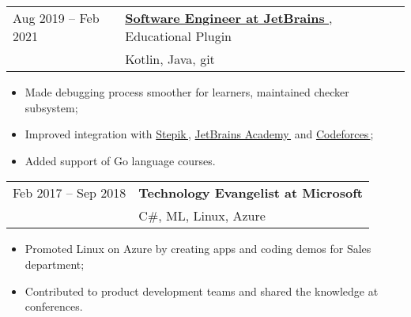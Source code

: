 \documentclass[11pt]{res} %
\let\orighref\href
\renewcommand{\href}[2]{\orighref{#1}{#2\,\faExternalLink}}
\begin{document}
\begin{resume}
        \begin{tabular}{ll}
            Aug 2019 -- Feb 2021 \quad & \textbf{\href{https://github.com/JetBrains/educational-plugin}{Software Engineer at JetBrains}}, Educational Plugin \\
            & Kotlin, Java, git \\
        \end{tabular}

        \begin{itemize} \itemsep -2pt
            \item Made debugging process smoother for learners, maintained checker subsystem;
            \item Improved integration with \href{https://stepik.org/}{Stepik}, \href{https://hyperskill.org}{JetBrains Academy} and \href{http://codeforces.com}{Codeforces};
            \item Added support of Go language courses.
        \end{itemize}


        \begin{tabular}{ll}
            Feb 2017 -- Sep 2018 \quad & {\textbf{Technology Evangelist at Microsoft}} \\
            & C\#, ML, Linux, Azure \\
        \end{tabular}

        \begin{itemize} \itemsep -2pt
            \item Promoted Linux on Azure by creating apps and coding demos for Sales department;
            \item Contributed to product development teams and shared the knowledge at conferences.
        \end{itemize}




\end{resume}
\end{document}
